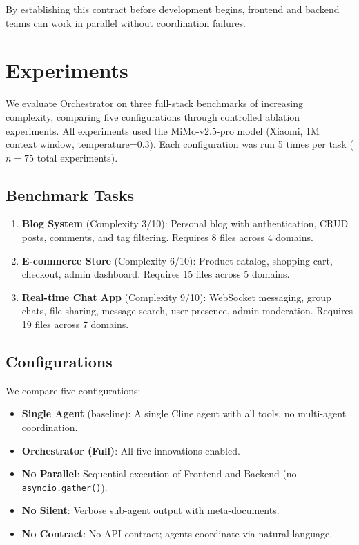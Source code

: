 \documentclass[12pt]{article}
\begin{document}
By establishing this contract before development begins, frontend and backend teams can work in parallel without coordination failures.

\section{Experiments}

We evaluate Orchestrator on three full-stack benchmarks of increasing complexity, comparing five configurations through controlled ablation experiments. All experiments used the MiMo-v2.5-pro model (Xiaomi, 1M context window, temperature=0.3). Each configuration was run 5 times per task ($n=75$ total experiments).

\subsection{Benchmark Tasks}

\begin{enumerate}
  \item \textbf{Blog System} (Complexity 3/10): Personal blog with authentication, CRUD posts, comments, and tag filtering. Requires 8 files across 4 domains.
  \item \textbf{E-commerce Store} (Complexity 6/10): Product catalog, shopping cart, checkout, admin dashboard. Requires 15 files across 5 domains.
  \item \textbf{Real-time Chat App} (Complexity 9/10): WebSocket messaging, group chats, file sharing, message search, user presence, admin moderation. Requires 19 files across 7 domains.
\end{enumerate}

\subsection{Configurations}

We compare five configurations:

\begin{itemize}
  \item \textbf{Single Agent} (baseline): A single Cline agent with all tools, no multi-agent coordination.
  \item \textbf{Orchestrator (Full)}: All five innovations enabled.
  \item \textbf{No Parallel}: Sequential execution of Frontend and Backend (no \texttt{asyncio.gather()}).
  \item \textbf{No Silent}: Verbose sub-agent output with meta-documents.
  \item \textbf{No Contract}: No API contract; agents coordinate via natural language.
\end{itemize}
\end{document}
